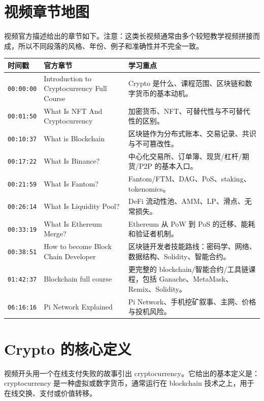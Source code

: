 \documentclass[UTF8,11pt]{ctexart}
\newcommand{\timestamp}[1]{\textcolor{blue!50!black}{\texttt{#1}}}
\begin{document}
\section{视频章节地图}
\label{sec:map}

视频官方描述给出的章节如下。注意：这类长视频通常由多个较短教学视频拼接而成，所以不同段落的风格、年份、例子和准确性并不完全一致。

\begin{longtable}{>{\raggedright\arraybackslash}p{2.4cm}>{\raggedright\arraybackslash}p{5.2cm}>{\raggedright\arraybackslash}p{7.1cm}}
\toprule
\textbf{时间戳} & \textbf{官方章节} & \textbf{学习重点} \\
\midrule
\endhead
\timestamp{00:00:00} & Introduction to Cryptocurrency Full Course & Crypto 是什么、课程范围、区块链和数字货币的基本动机。 \\
\timestamp{00:01:50} & What Is NFT And Cryptocurrency & 加密货币、NFT、可替代性与不可替代性的区别。 \\
\timestamp{00:10:37} & What is Blockchain & 区块链作为分布式账本、交易记录、共识与不可篡改性。 \\
\timestamp{00:17:22} & What Is Binance? & 中心化交易所、订单簿、现货/杠杆/期货/P2P 的基本入口。 \\
\timestamp{00:21:59} & What Is Fantom? & Fantom/FTM、DAG、PoS、staking、tokenomics。 \\
\timestamp{00:26:14} & What Is Liquidity Pool? & DeFi 流动性池、AMM、LP、滑点、无常损失。 \\
\timestamp{00:33:19} & What Is Ethereum Merge? & Ethereum 从 PoW 到 PoS 的迁移、能耗和验证者机制。 \\
\timestamp{00:38:51} & How to become Block Chain Developer & 区块链开发者技能路线：密码学、网络、数据结构、Solidity、智能合约。 \\
\timestamp{01:42:37} & Blockchain full course & 更完整的 blockchain/智能合约/工具链课程，包括 Ganache、MetaMask、Remix、Solidity。 \\
\timestamp{06:16:16} & Pi Network Explained & Pi Network、手机挖矿叙事、主网、价格与投机风险。 \\
\bottomrule
\end{longtable}

\section{Crypto 的核心定义}
\label{sec:foundation}

视频开头用一个在线支付失败的故事引出 cryptocurrency。它给出的基本定义是：cryptocurrency 是一种虚拟或数字货币，通常运行在 blockchain 技术之上，用于在线交换、支付或价值转移。
\end{document}
